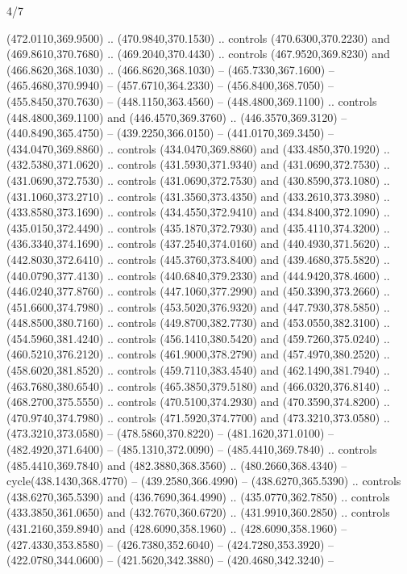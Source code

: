 \begin{flagdescription}{4/7}
\begin{scope}[shift={(0.5\flaglength,0.5\flagwidth)},scale=\flagwidth*\stretchfactor/820]
\begin{scope}[scale=1.87,xshift=-138mm,yshift=75mm]
\begin{scope}[y=0.8pt, x=0.8pt, yscale=-1, xscale=1]
\begin{scope}[fill=c9ca168]
  (472.0110,369.9500) .. (470.9840,370.1530) .. controls (470.6300,370.2230) and
  (469.8610,370.7680) .. (469.2040,370.4430) .. controls (467.9520,369.8230) and
  (466.8620,368.1030) .. (466.8620,368.1030) -- (465.7330,367.1600) --
  (465.4680,370.9940) -- (457.6710,364.2330) -- (456.8400,368.7050) --
  (455.8450,370.7630) -- (448.1150,363.4560) -- (448.4800,369.1100) .. controls
  (448.4800,369.1100) and (446.4570,369.3760) .. (446.3570,369.3120) --
  (440.8490,365.4750) -- (439.2250,366.0150) -- (441.0170,369.3450) --
  (434.0470,369.8860) .. controls (434.0470,369.8860) and (433.4850,370.1920) ..
  (432.5380,371.0620) .. controls (431.5930,371.9340) and (431.0690,372.7530) ..
  (431.0690,372.7530) .. controls (431.0690,372.7530) and (430.8590,373.1080) ..
  (431.1060,373.2710) .. controls (431.3560,373.4350) and (433.2610,373.3980) ..
  (433.8580,373.1690) .. controls (434.4550,372.9410) and (434.8400,372.1090) ..
  (435.0150,372.4490) .. controls (435.1870,372.7930) and (435.4110,374.3200) ..
  (436.3340,374.1690) .. controls (437.2540,374.0160) and (440.4930,371.5620) ..
  (442.8030,372.6410) .. controls (445.3760,373.8400) and (439.4680,375.5820) ..
  (440.0790,377.4130) .. controls (440.6840,379.2330) and (444.9420,378.4600) ..
  (446.0240,377.8760) .. controls (447.1060,377.2990) and (450.3390,373.2660) ..
  (451.6600,374.7980) .. controls (453.5020,376.9320) and (447.7930,378.5850) ..
  (448.8500,380.7160) .. controls (449.8700,382.7730) and (453.0550,382.3100) ..
  (454.5960,381.4240) .. controls (456.1410,380.5420) and (459.7260,375.0240) ..
  (460.5210,376.2120) .. controls (461.9000,378.2790) and (457.4970,380.2520) ..
  (458.6020,381.8520) .. controls (459.7110,383.4540) and (462.1490,381.7940) ..
  (463.7680,380.6540) .. controls (465.3850,379.5180) and (466.0320,376.8140) ..
  (468.2700,375.5550) .. controls (470.5100,374.2930) and (470.3590,374.8200) ..
  (470.9740,374.7980) .. controls (471.5920,374.7700) and (473.3210,373.0580) ..
  (473.3210,373.0580) -- (478.5860,370.8220) -- (481.1620,371.0100) --
  (482.4920,371.6400) -- (485.1310,372.0090) -- (485.4410,369.7840) .. controls
  (485.4410,369.7840) and (482.3880,368.3560) .. (480.2660,368.4340) --
  cycle(438.1430,368.4770) -- (439.2580,366.4990) -- (438.6270,365.5390) ..
  controls (438.6270,365.5390) and (436.7690,364.4990) .. (435.0770,362.7850) ..
  controls (433.3850,361.0650) and (432.7670,360.6720) .. (431.9910,360.2850) ..
  controls (431.2160,359.8940) and (428.6090,358.1960) .. (428.6090,358.1960) --
  (427.4330,353.8580) -- (426.7380,352.6040) -- (424.7280,353.3920) --
  (422.0780,344.0600) -- (421.5620,342.3880) -- (420.4680,342.3240) --

\end{scope}
\end{scope}
\end{scope}
\end{scope}
\end{flagdescription}
